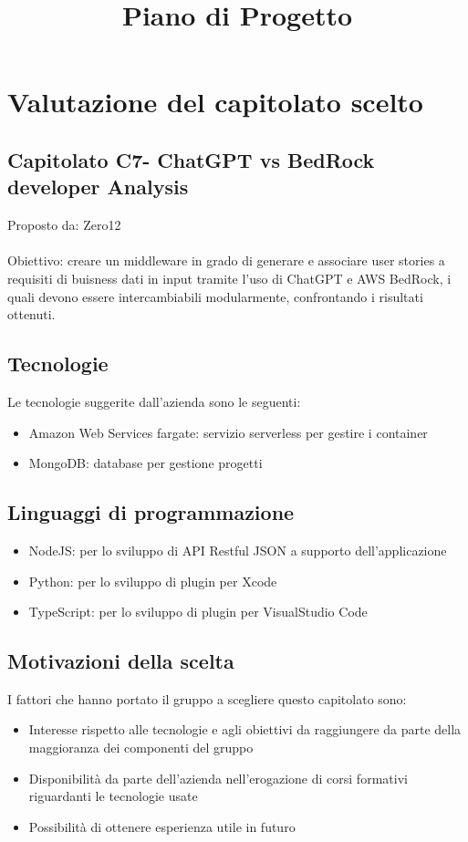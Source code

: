 \documentclass[12pt]{article}
\title{Piano di Progetto}
\date{}
\begin{document}
\maketitle

\section{Valutazione del capitolato scelto}
\subsection{Capitolato C7- ChatGPT vs BedRock developer Analysis}
Proposto da: Zero12\\ \\
Obiettivo: creare un middleware in grado di generare e associare user stories a requisiti di buisness dati in input tramite l’uso di ChatGPT e AWS BedRock, i quali devono essere intercambiabili modularmente, confrontando i risultati ottenuti.
\subsection{Tecnologie}
Le tecnologie suggerite dall’azienda sono le seguenti:
\begin{itemize}
    \item Amazon Web Services fargate: servizio serverless per gestire i container
    \item MongoDB: database per gestione progetti
\end{itemize}
\subsection{Linguaggi di programmazione}
\begin{itemize}
    \item NodeJS: per lo sviluppo di API Restful JSON a supporto dell’applicazione
    \item Python: per lo sviluppo di plugin per Xcode
    \item TypeScript: per lo sviluppo di plugin per VisualStudio Code
\end{itemize}
\subsection{Motivazioni della scelta}
I fattori che hanno portato il gruppo a scegliere questo capitolato sono:
\begin{itemize}
    \item Interesse rispetto alle tecnologie e agli obiettivi da raggiungere da parte della maggioranza dei componenti del gruppo
    \item Disponibilità da parte dell’azienda nell’erogazione di corsi formativi riguardanti le tecnologie usate 
    \item Possibilità di ottenere esperienza utile in futuro
\end{itemize}
\end{document}
